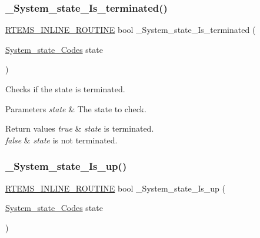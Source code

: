 \subsubsection{\texorpdfstring{\_System\_state\_Is\_terminated()}{\_System\_state\_Is\_terminated()}}
{\footnotesize\ttfamily \mbox{\hyperlink{group__RTEMSScoreBaseDefs_gac216239df231d5dbd15e3520b0b9313f}{R\+T\+E\+M\+S\+\_\+\+I\+N\+L\+I\+N\+E\+\_\+\+R\+O\+U\+T\+I\+NE}} bool \+\_\+\+System\+\_\+state\+\_\+\+Is\+\_\+terminated (\begin{DoxyParamCaption}\item[{\mbox{\hyperlink{group__RTEMSScoreSysState_ga959824776c35a999ecd2720fde987d72}{System\+\_\+state\+\_\+\+Codes}}}]{state }\end{DoxyParamCaption})}



Checks if the state is terminated. 


\begin{DoxyParams}{Parameters}
{\em state} & The state to check.\\
\hline
\end{DoxyParams}

\begin{DoxyRetVals}{Return values}
{\em true} & {\itshape state} is terminated. \\
\hline
{\em false} & {\itshape state} is not terminated. \\
\hline
\end{DoxyRetVals}
\mbox{\label{group__RTEMSScoreSysState_gaa34964b3212ea72baf5ec0064f5d28df}} 
\subsubsection{\texorpdfstring{\_System\_state\_Is\_up()}{\_System\_state\_Is\_up()}}
{\footnotesize\ttfamily \mbox{\hyperlink{group__RTEMSScoreBaseDefs_gac216239df231d5dbd15e3520b0b9313f}{R\+T\+E\+M\+S\+\_\+\+I\+N\+L\+I\+N\+E\+\_\+\+R\+O\+U\+T\+I\+NE}} bool \+\_\+\+System\+\_\+state\+\_\+\+Is\+\_\+up (\begin{DoxyParamCaption}\item[{\mbox{\hyperlink{group__RTEMSScoreSysState_ga959824776c35a999ecd2720fde987d72}{System\+\_\+state\+\_\+\+Codes}}}]{state }\end{DoxyParamCaption})}



